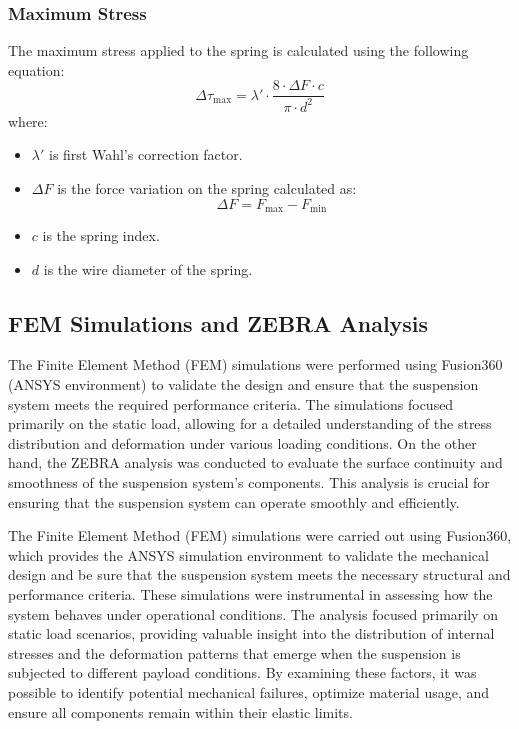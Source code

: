 \documentclass[11pt]{article}
\begin{document}
\newpage
\subsubsection{Maximum Stress}
The maximum stress applied to the spring is calculated using the following equation:
\begin{equation}
    \Delta \tau_\text{max} = \lambda' \cdot \frac{8 \cdot \Delta F \cdot c}{\pi \cdot d^2}
\end{equation}
where:
\begin{itemize}
    \item \( \lambda' \) is first Wahl's correction factor.
    \item \( \Delta F \) is the force variation on the spring calculated as: $$\Delta F = F_\text{max} - F_\text{min}$$
    \item $c$ is the spring index.
    \item $d$ is the wire diameter of the spring.
\end{itemize}
\newpage

\subsection{FEM Simulations and ZEBRA Analysis}
The Finite Element Method (FEM) simulations were performed using Fusion360 (ANSYS environment) to validate the design and ensure that the suspension system meets the required
performance criteria. The simulations focused primarily on the static load, allowing for a detailed understanding of the stress distribution and deformation under various loading conditions.
On the other hand, the ZEBRA analysis was conducted to evaluate the surface continuity and smoothness of the suspension system's components. This analysis is crucial for ensuring that the suspension system can operate smoothly and efficiently.

The Finite Element Method (FEM) simulations were carried out using Fusion360, which provides the ANSYS simulation environment to validate the mechanical design and be sure that the suspension system meets the necessary structural and performance criteria. These simulations were instrumental in assessing how the system behaves under operational conditions. The analysis focused primarily on static load scenarios, providing valuable insight into the distribution of internal stresses and the deformation patterns that emerge when the suspension is subjected to different payload conditions. By examining these factors, it was possible to identify potential mechanical failures, optimize material usage, and ensure all components remain within their elastic limits.
\end{document}
